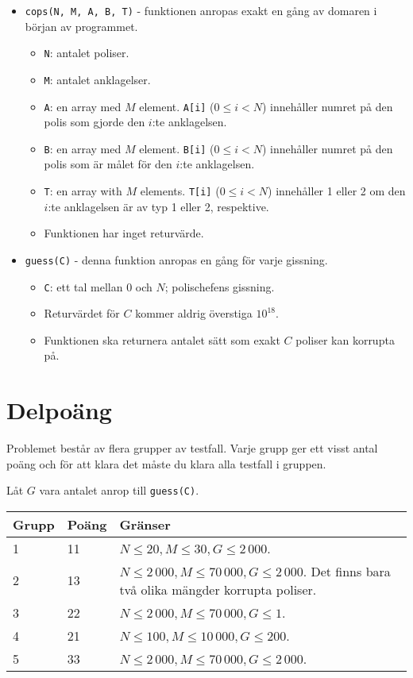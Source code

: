 \begin{itemize}
  \item \texttt{cops(N, M, A, B, T)} - funktionen anropas exakt en gång av domaren i början av programmet.
  \begin{itemize}
    \item \texttt{N}: antalet poliser.
    \item \texttt{M}: antalet anklagelser.
    \item \texttt{A}: en array med $M$ element. \texttt{A[i]} ($0 \le i < N$) innehåller numret på den polis som gjorde den $i$:te anklagelsen.
    \item \texttt{B}: en array med $M$ element. \texttt{B[i]} ($0 \le i < N$) innehåller numret på den polis som är målet för den $i$:te anklagelsen.
    \item \texttt{T}: en array with $M$ elements. \texttt{T[i]} ($0 \le i < N$) innehåller 1 eller 2 om den $i$:te anklagelsen är av typ 1 eller 2, respektive.
		\item Funktionen har inget returvärde.
  \end{itemize}
\end{itemize}

\begin{itemize}
  \item \texttt{guess(C)} - denna funktion anropas en gång för varje gissning.
  \begin{itemize}
    \item \texttt{C}: ett tal mellan $0$ och $N$; polischefens gissning.
    \item Returvärdet för $C$ kommer aldrig överstiga $10^{18}$.
		\item Funktionen ska returnera antalet sätt som exakt $C$ poliser kan korrupta på.
  \end{itemize}
\end{itemize}

\section*{Delpoäng}
Problemet består av flera grupper av testfall. Varje grupp ger ett visst antal poäng och för att klara det måste du klara alla testfall i gruppen.

Låt $G$ vara antalet anrop till \texttt{guess(C)}.
\begin{tabular}{|l|l|l|}
  \hline
  \textbf{Grupp} & \textbf{Poäng} & \textbf{Gränser} \\ \hline
  1 & 11 & $N \le 20, M \le 30, G \le 2\,000$. \\ \hline
  2 & 13 & $N \le 2\,000, M \le 70\,000, G \le 2\,000$. Det finns bara två olika mängder korrupta poliser. \\ \hline
  3 & 22 & $N \le 2\,000, M \le 70\,000, G \le 1$. \\ \hline
  4 & 21 & $N \le 100, M \le 10\,000, G \le 200$. \\ \hline
  5 & 33 & $N \le 2\,000, M \le 70\,000, G \le 2\,000$. \\ \hline
\end{tabular}

